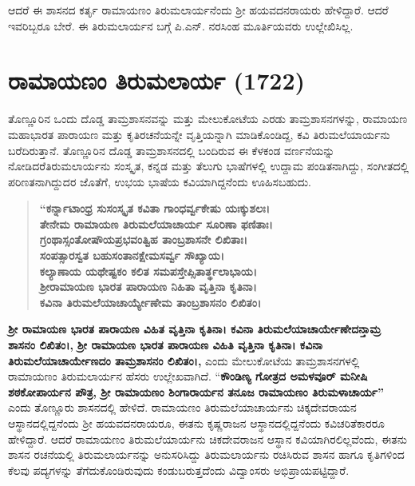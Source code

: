 ಆದರೆ ಈ ಶಾಸನದ ಕರ್ತೃ ರಾಮಾಯಣಂ ತಿರುಮಲಾರ್ಯನೆಂದು ಶ‍್ರೀ ಹಯವದನರಾಯರು ಹೇಳಿದ್ದಾರೆ. ಆದರೆ ಇವರಿಬ್ಬರೂ ಬೇರೆ. ಈ ತಿರುಮಲಾರ್ಯನ ಬಗ್ಗೆ ಪಿ.ಎನ್​. ನರಸಿಂಹ ಮೂರ್ತಿಯವರು ಉಲ್ಲೇಖಿಸಿಲ್ಲ.


\section{ರಾಮಾಯಣಂ ತಿರುಮಲಾರ್ಯ (1722)}

ತೊಣ್ಣೂರಿನ ಒಂದು ದೊಡ್ಡ ತಾಮ್ರಶಾಸನವನ್ನು ಮತ್ತು ಮೇಲುಕೋಟೆಯ ಎರಡು ತಾಮ್ರಶಾಸನಗಳನ್ನು, ರಾಮಾಯಣ ಮಹಾಭಾರತ ಪಾರಾಯಣ ಮತ್ತು ಕೃತಿರಚನೆಯನ್ನೇ ವೃತ್ತಿಯನ್ನಾಗಿ ಮಾಡಿಕೊಂಡಿದ್ದ, ಕವಿ ತಿರುಮಲೆಯಾರ್ಯನು ಬರೆದಿರುತ್ತಾನೆ. ತೊಣ್ಣೂರಿನ ದೊಡ್ಡ ತಾಮ್ರಶಾಸನದಲ್ಲಿ ಬಂದಿರುವ ಈ ಕೆಳಕಂಡ ವರ್ಣನೆಯನ್ನು ನೋಡಿದರೆ\break ತಿರುಮಲಾರ್ಯನು ಸಂಸ್ಕೃತ, ಕನ್ನಡ ಮತ್ತು ತೆಲುಗು ಭಾಷೆಗಳಲ್ಲಿ ಉದ್ದಾಮ ಪಂಡಿತನಾಗಿದ್ದು, ಸಂಗೀತದಲ್ಲಿ ಪರಿಣತ\-ನಾಗಿದ್ದುದರ ಜೊತೆಗೆ, ಉಭಯ ಭಾಷೆಯ ಕವಿಯಾಗಿದ್ದನೆಂದು ಊಹಿಸಬಹುದು.

\begin{verse}
\textbf{“ಕರ್ನ್ನಾಟಾಂಧ್ರ ಸುಸಂಸ್ಕೃತ ಕವಿತಾ ಗಾಂಧರ್ವ್ವಕೇಷು ಯಃಕ್ಕುಶಲಃ। } \\\textbf{ತೇನೇಮ ರಾಮಾಯಣ ತಿರುಮಲೆಯಾಚಾರ್ಯ ಸೂರಿಣಾ ಫಣಿತಾಃ।} \\\textbf{ಗ್ರಂಥಾಸ್ಸಂತೋಷೌಯಪ್ರಭವಂತ್ವಿಹ ತಾಂಬ್ರಶಾಸನೇ ಲಿಖಿತಾಃ।} \\\textbf{ಸಂಪತ್ಸಾರಸ್ವತ ಬಹುಸಂತಾನಕ್ಷೇಮಸರ್ವ್ವ ಸೌಖ್ಯಾಯ।} \\\textbf{ಕಲ್ಯಾಣಾಯ ಯಥೇಷ್ಟಕಂ ಕಲಿತ ಸಮಪಸ್ತೇಪ್ಸಿತಾರ್ತ್ಥಲಾಭಾಯ।} \\\textbf{ಶ‍್ರೀರಾಮಾಯಣ ಭಾರತ ಪಾರಾಯಣ ನಿಹಿತಾ ವೃತ್ತಿನಾ ಕೃತಿನಾ।} \\\textbf{ಕವಿನಾ ತಿರುಮಲೆಯಾಚಾರ್ಯ್ಯೇಣೇಮ ತಾಂಬ್ರಶಾಸನಂ ಲಿಖಿತಂ।}
\end{verse}

\textbf{ಶ‍್ರೀ ರಾಮಾಯಣ ಭಾರತ ಪಾರಾಯಣ ವಿಹಿತ ವೃತ್ತಿನಾ ಕೃತಿನಾ। ಕವಿನಾ ತಿರುಮಲೆಯಾಚಾರ್ಯೇಣೇದನ್ತಾಮ್ರ ಶಾಸನಂ ಲಿಖಿತಂ।,}\textbf{ ಶ‍್ರೀ ರಾಮಾಯಣ ಭಾರತ ಪಾರಾಯಣ ವಿಹಿತಿ ವೃತ್ತಿನಾ ಕೃತಿನಾ। ಕವಿನಾ ತಿರುಮಲೆಯಾಚಾರ್ಯೇಣದಂ ತಾಮ್ರಶಾಸನಂ ಲಿಖಿತಂ।,} ಎಂದು ಮೇಲುಕೋಟೆಯ ತಾಮ್ರಶಾಸನಗಳಲ್ಲಿ ರಾಮಾಯಣಂ ತಿರುಮಲಾರ್ಯನ ಹೆಸರು ಉಲ್ಲೇಖವಾಗಿದೆ. “\textbf{ಕೌಂಡಿಣ್ಯ ಗೋತ್ರದ ಅಮಳವೂರ್​ ಮನೀಷಿ ಶಠಕೋಪಾರ್ಯನ ಪೌತ್ರ, ಶ‍್ರೀ ರಾಮಾಯಣಂ ಶಿಂಗಾರಾರ್ಯನ ತನೂಜ ರಾಮಾಯಣಂ ತಿರುಮಳಾಚಾರ್ಯ”} ಎಂದು ತೊಣ್ಣೂರು ಶಾಸನದಲ್ಲಿ ಹೇಳಿದೆ. ರಾಮಾಯಣಂ ತಿರುಮಲೆಯಾಚಾರ್ಯನು ಚಿಕ್ಕದೇವರಾಯನ ಆಸ್ಥಾನದಲ್ಲಿದ್ದನೆಂದು ಶ‍್ರೀ ಹಯವದನರಾಯರೂ, ಈತನು ಕೃಷ್ಣರಾಜನ ಆಸ್ಥಾನದಲ್ಲಿದ್ದನೆಂದು ಕವಿಚರಿತೆಕಾರರೂ ಹೇಳಿದ್ದಾರೆ. ಆದರೆ ರಾಮಾಯಣಂ ತಿರುಮಲೆಯಾರ್ಯನು ಚಿಕದೇವರಾಜನ ಆಸ್ಥಾನ ಕವಿಯಾಗಿರಲಿಲ್ಲವೆಂದು, ಈತನು ಶಾಸನ ರಚನೆಯಲ್ಲಿ ತಿರುಮಲಾರ್ಯನನ್ನು ಅನುಸರಿಸಿದ್ದು ತಿರುಮಲಾರ್ಯನು ರಚಿಸಿರುವ ಶಾಸನ ಹಾಗೂ ಕೃತಿಗಳಿಂದ ಕೆಲವು ಪದ್ಯಗಳನ್ನು ತೆಗೆದುಕೊಂಡಿರುವುದು ಕಂಡುಬರುತ್ತದೆಂದು ವಿದ್ವಾಂಸರು ಅಭಿಪ್ರಾಯಪಟ್ಟಿದ್ದಾರೆ.

